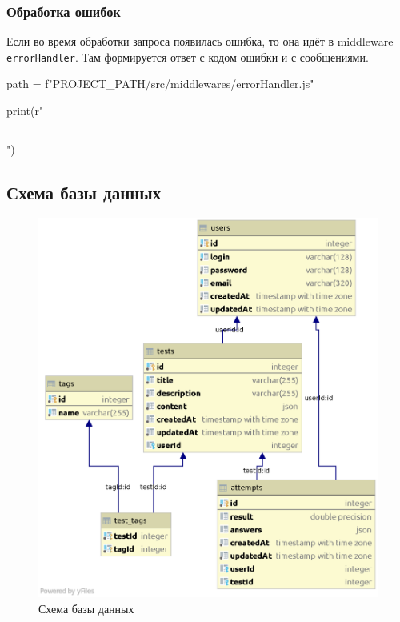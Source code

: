 \subsubsection{Обработка ошибок}
Если во время обработки запроса появилась ошибка, то она идёт в middleware \texttt{errorHandler}. Там формируется ответ с кодом ошибки и с сообщениями.

\begin{pycode}
path = f"{PROJECT_PATH}/src/middlewares/errorHandler.js"

print(r"\inputminted{js}{" + path + r"}")
\end{pycode}

\subsection{Схема базы данных}
\begin{figure}[h!]
    \begin{center}
        \includegraphics[scale=0.6]{images/db_scheme.eps}
    \end{center}
    \caption{Схема базы данных}
\end{figure}

